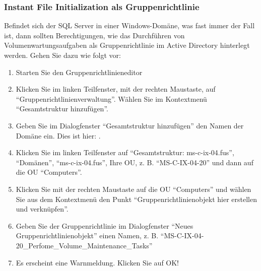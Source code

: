         \subsubsection{Instant File Initialization als Gruppenrichtlinie}
        \label{instant_file_initialization}
          Befindet sich der SQL Server in einer Windows-Domäne, was fast immer der
          Fall ist, dann sollten Berechtigungen, wie das Durchführen von
          Volumenwartungsaufgaben als Gruppenrichtlinie im Active Directory
          hinterlegt werden. Gehen Sie dazu wie folgt vor:
          \begin{enumerate}
              \item Starten Sie den Gruppenrichtlinieneditor
              \item Klicken Sie im linken Teilfenster, mit der rechten Maustaste,
              auf \enquote{Gruppenrichtlinienverwaltung}. Wählen Sie im
              Kontextmenü \enquote{Gesamtstruktur hinzufügen}.
              \item Geben Sie im Dialogfenster \enquote{Gesamtstruktur hinzufügen}
              den Namen der Domäne ein. Dies ist hier: .
              \item Klicken Sie im linken Teilfenster auf
              \enquote{Gesamtstruktur: ms-c-ix-04.fus}, \enquote{Domänen},
              \enquote{ms-c-ix-04.fus}, Ihre OU, z. B.
              \enquote{MS-C-IX-04-20} und dann auf die OU \enquote{Computers}.
              \item Klicken Sie mit der rechten Maustaste auf die OU
              \enquote{Computers} und wählen Sie aus dem Kontextmenü den Punkt
              \enquote{Gruppenrichtlinienobjekt hier erstellen und verknüpfen}.
              \item Geben Sie der Gruppenrichtlinie im Dialogfenster
              \enquote{Neues Gruppenrichtlinienobjekt} einen Namen, z. B.
              \enquote{MS-C-IX-04-20\_Perfome\_Volume\_Maintenance\_Tasks}
              \item Es erscheint eine Warnmeldung. Klicken Sie auf OK!

\end{enumerate}
